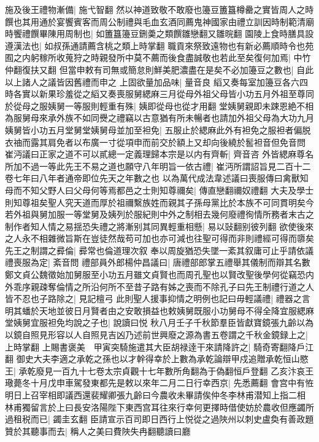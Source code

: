 施及後王禮物漸備|{
	施弋智翻}
然以神道致敬不敢廢也籩豆簠簋樽罍之實皆周人之時饌也其用通於宴饗賓客而周公制禮與毛血玄酒同薦鬼神國家由禮立訓因時制範清廟時饗禮饌畢陳用周制也|{
	如簠簋籩豆鉶羮之類饌雛戀翻又雛晥翻}
園陵上食時膳具設遵漢法也|{
	如叔孫通請薦含桃之類上時掌翻}
職貢來祭致遠物也有新必薦順時令也苑囿之内躬稼所收蒐狩之時親發所中莫不薦而後食盡誠敬也若此至矣復何加焉|{
	中竹仲翻復扶又翻}
但當申敕有司無或簡怠則鮮美肥濃盡在是矣不必加籩豆之數也|{
	自此以上諸人之議皆因舊禮而申之}
上固欲量加品味|{
	量音良}
縚又奏每室加籩豆各六四時各實以新果珍羞從之縚又奏喪服舅緦麻三月從母外祖父母皆小功五月外祖至尊同於從母之服姨舅一等服則輕重有殊|{
	姨即從母也從才用翻}
堂姨舅親即未踈恩絶不相為服舅母來承外族不如同㸑之禮竊以古意猶有所未暢者也請加外祖父母為大功九月姨舅皆小功五月堂舅堂姨舅母並加至袒免|{
	五服止於緦麻此外有袒免之服袒者偏脱衣䄂而露其肩免者以布廣一寸從項申而前交於額上又却向後繞於䯻袒音但免音問}
崔沔議曰正家之道不可以貳總一定義理歸本宗是以内有齊斬|{
	齊音咨}
外皆緦麻尊名所加不過一等此先王不易之道也願守八年明旨一依古禮|{
	崔沔所謂詔旨見二百十二卷七年曰八年者通帝即位先天之年數之也}
以為萬代成法韋述議曰喪服傳曰禽獸知母而不知父野人曰父母何等焉都邑之士則知尊禰矣|{
	傳直戀翻禰奴禮翻}
大夫及學士則知尊祖矣聖人究天道而厚於祖禰繫族姓而親其子孫母黨比於本族不可同貫明矣今若外祖與舅加服一等堂舅及姨列於服紀則中外之制相去幾何廢禮徇情所務者末古之制作者知人情之易揺恐失禮之將漸别其同異輕重相懸|{
	易以䜴翻别彼列翻}
欲使後來之人永不相雜微旨斯在豈徒然哉苟可加也亦可減也往聖可得而非則禮經可得而隳矣先王之制謂之彛倫|{
	彛常也倫道理次叙}
奉以周旋猶恐失墜一紊其叙庸可止乎請依議禮喪服為定|{
	紊音問}
禮部員外郎楊仲昌議曰|{
	唐禮部郎掌五禮舉其儀制而辯其名數}
鄭文貞公魏徵始加舅服至小功五月雖文貞賢也而周孔聖也以賢改聖後學何從竊恐内外乖序親疎奪倫情之所沿何所不至昔子路有姊之喪而不除孔子曰先王制禮行道之人皆不忍也子路除之|{
	見記檀弓}
此則聖人援事抑情之明例也記曰毋輕議禮|{
	禮器之言}
明其蟠於天地並彼日月賢者由之安敢損益也敕姨舅既服小功舅母不得全降宜服緦麻堂姨舅宜服袒免均說之子也|{
	說讀曰悦}
秋八月壬子千秋節羣臣皆獻寶鏡張九齡以為以鏡自照見形容以人自照見吉凶乃述前世興廢之源為書五卷謂之千秋金鏡録上之|{
	上時掌翻}
上賜書褒美　甲寅突騎施遣其大臣胡禄逹干來請降許之|{
	騎奇寄翻降戶江翻}
御史大夫李適之承乾之孫也以才幹得幸於上數為承乾論辯甲戍追贈承乾恒山愍王|{
	承乾廢見一百九十七卷太宗貞觀十七年數所角翻為于偽翻恒戶登翻}
乙亥汴哀王璥薨冬十月戊申車駕發東都先是敕以來年二月二日行幸西京|{
	先悉薦翻}
會宫中有恠明日上召宰相即議西還裴耀卿張九齡曰今農收未畢請俟仲冬李林甫潜知上指二相林甫獨留言於上曰長安洛陽陛下東西宫耳往來行幸何更擇時借使妨於農收但應蠲所過租税而已|{
	蠲圭玄翻}
臣請宣示百司即日西行上悦從之過陜州以刺史盧奐有善政題贊於其聽事而去|{
	稱人之美曰費陜失冉翻聽讀曰廳}
